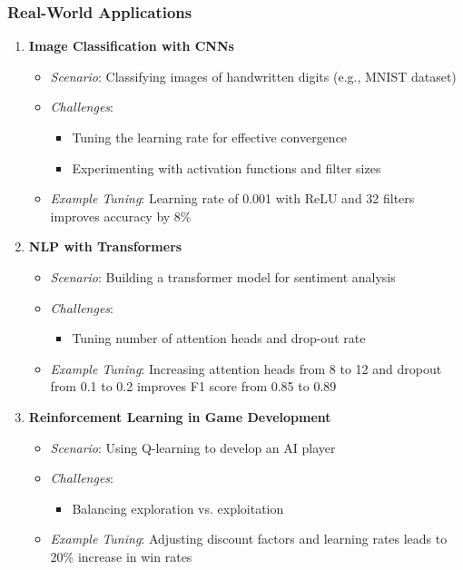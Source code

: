 \documentclass[aspectratio=169]{beamer}
\begin{document}
\begin{frame}
    \frametitle{Real-World Applications}
    \begin{enumerate}
        \item \textbf{Image Classification with CNNs}
            \begin{itemize}
                \item \textit{Scenario}: Classifying images of handwritten digits (e.g., MNIST dataset)
                \item \textit{Challenges}:
                    \begin{itemize}
                        \item Tuning the learning rate for effective convergence
                        \item Experimenting with activation functions and filter sizes
                    \end{itemize}
                \item \textit{Example Tuning}: Learning rate of 0.001 with ReLU and 32 filters improves accuracy by 8\%
            \end{itemize}
        
        \item \textbf{NLP with Transformers}
            \begin{itemize}
                \item \textit{Scenario}: Building a transformer model for sentiment analysis
                \item \textit{Challenges}:
                    \begin{itemize}
                        \item Tuning number of attention heads and drop-out rate
                    \end{itemize}
                \item \textit{Example Tuning}: Increasing attention heads from 8 to 12 and dropout from 0.1 to 0.2 improves F1 score from 0.85 to 0.89
            \end{itemize}
        
        \item \textbf{Reinforcement Learning in Game Development}
            \begin{itemize}
                \item \textit{Scenario}: Using Q-learning to develop an AI player
                \item \textit{Challenges}:
                    \begin{itemize}
                        \item Balancing exploration vs. exploitation
                    \end{itemize}
                \item \textit{Example Tuning}: Adjusting discount factors and learning rates leads to 20\% increase in win rates
            \end{itemize}
    \end{enumerate}
\end{frame}
\end{document}

